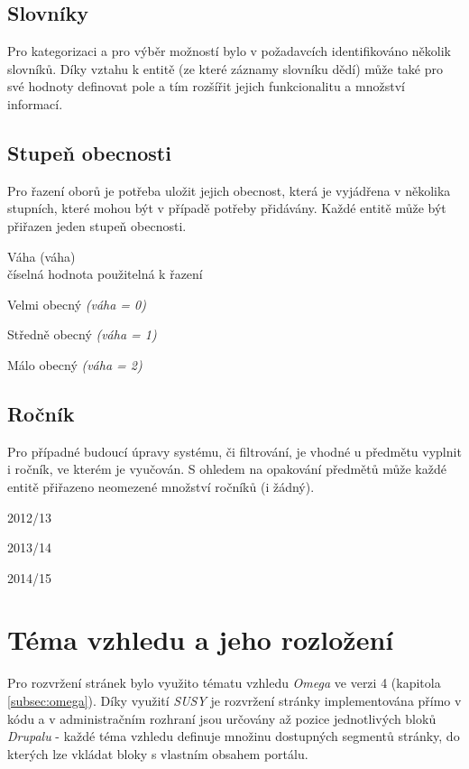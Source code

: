\subsection{Slovníky}
\label{sec:slovniky}

Pro kategorizaci a pro výběr možností bylo v požadavcích identifikováno několik slovníků. Díky vztahu k entitě (ze které záznamy slovníku dědí) může také pro své hodnoty definovat pole a tím rozšířit jejich funkcionalitu a množství informací.

\subsection*{Stupeň obecnosti}
Pro řazení oborů je potřeba uložit jejich obecnost, která je vyjádřena v několika stupních, které mohou být v případě potřeby přidávány. Každé entitě může být přiřazen jeden stupeň obecnosti.

\begin{list}{-}{Pole}
  \item Váha (váha) \hfill \\
    číselná hodnota použitelná k řazení
\end{list}

\begin{list}{-}{Hodnoty}
  \item Velmi obecný \emph{(váha = 0)} 
  \item Středně obecný \emph{(váha = 1)}
  \item Málo obecný \emph{(váha = 2)}
\end{list}

\subsection*{Ročník}
Pro případné budoucí úpravy systému, či filtrování, je vhodné u předmětu vyplnit i ročník, ve kterém je vyučován. S ohledem na opakování předmětů může každé entitě přiřazeno neomezené množství ročníků (i žádný). 

\begin{list}{-}{Hodnoty}
  \item 2012/13
  \item 2013/14
  \item 2014/15
\end{list}

\section{Téma vzhledu a jeho rozložení}
\label{sec:tema-vzhledu}
Pro rozvržení stránek bylo využito tématu vzhledu \emph{Omega} ve verzi 4 (kapitola \ref{subsec:omega}). Díky využití \emph{SUSY} je rozvržení stránky implementována přímo v kódu a v administračním rozhraní jsou určovány až pozice jednotlivých bloků \emph{Drupalu} - každé téma vzhledu definuje množinu dostupných segmentů stránky, do kterých lze vkládat bloky s vlastním obsahem portálu. 

